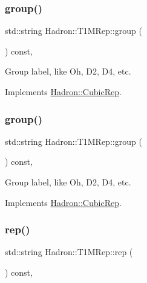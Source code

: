 \subsubsection{\texorpdfstring{group()}{group()}\hspace{0.1cm}{\footnotesize\ttfamily [1/2]}}
{\footnotesize\ttfamily std\+::string Hadron\+::\+T1\+M\+Rep\+::group (\begin{DoxyParamCaption}{ }\end{DoxyParamCaption}) const\hspace{0.3cm}{\ttfamily [inline]}, {\ttfamily [virtual]}}

Group label, like Oh, D2, D4, etc. 

Implements \mbox{\hyperlink{structHadron_1_1CubicRep_a0748f11ec87f387062c8e8981339a29c}{Hadron\+::\+Cubic\+Rep}}.

\mbox{\label{structHadron_1_1T1MRep_afd1a046d8c258d11503b579df7489634}} 
\subsubsection{\texorpdfstring{group()}{group()}\hspace{0.1cm}{\footnotesize\ttfamily [2/2]}}
{\footnotesize\ttfamily std\+::string Hadron\+::\+T1\+M\+Rep\+::group (\begin{DoxyParamCaption}{ }\end{DoxyParamCaption}) const\hspace{0.3cm}{\ttfamily [inline]}, {\ttfamily [virtual]}}

Group label, like Oh, D2, D4, etc. 

Implements \mbox{\hyperlink{structHadron_1_1CubicRep_a0748f11ec87f387062c8e8981339a29c}{Hadron\+::\+Cubic\+Rep}}.

\mbox{\label{structHadron_1_1T1MRep_a2a30092deab94944ea636fd8715be68d}} 
\subsubsection{\texorpdfstring{rep()}{rep()}\hspace{0.1cm}{\footnotesize\ttfamily [1/2]}}
{\footnotesize\ttfamily std\+::string Hadron\+::\+T1\+M\+Rep\+::rep (\begin{DoxyParamCaption}{ }\end{DoxyParamCaption}) const\hspace{0.3cm}{\ttfamily [inline]}, {\ttfamily [virtual]}}

